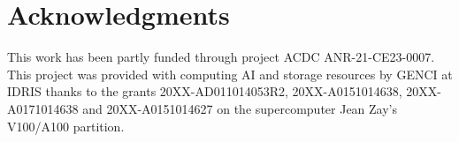 \documentclass{article} %
\begin{document}
\section{Acknowledgments}
\label{sec:acknowledgments}

This work has been partly funded through project ACDC ANR-21-CE23-0007.
This project was provided with computing AI and storage resources by GENCI at IDRIS thanks to the grants 20XX-AD011014053R2, 20XX-A0151014638, 20XX-A0171014638 and 20XX-A0151014627 on the supercomputer Jean Zay's V100/A100 partition.
\newpage



%



\appendix

\end{document}
